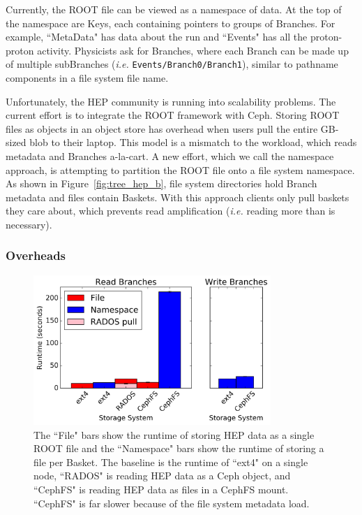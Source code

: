 Currently, the ROOT file can be viewed as a namespace of data. At the top of
the namespace are Keys, each containing pointers to groups of Branches. For
example, ``MetaData" has data about the run and ``Events" has all the
proton-proton activity. Physicists ask for Branches, where each Branch can be
made up of multiple subBranches ({\it i.e.} \texttt{Events/Branch0/Branch1}),
similar to pathname components in a file system file name. 

Unfortunately, the HEP community is running into scalability problems.  The
current effort is to integrate the ROOT framework with Ceph.  Storing ROOT
files as objects in an object store has overhead when users pull the entire
GB-sized blob to their laptop.  This model is a mismatch to the workload, which
reads metadata and Branches a-la-cart. A new effort, which we call the
namespace approach, is attempting to partition the ROOT file onto a file system
namespace. As shown in Figure~\ref{fig:tree_hep_b}, file system directories
hold Branch metadata and files contain Baskets. With this approach clients only
pull baskets they care about, which prevents read amplification ({\it i.e.}
reading more than is necessary).


\subsubsection{Overheads}

\begin{figure}[tb]
\centering
  \includegraphics[width=90mm]{figures/hep_runtime.png}
  \caption{The ``File" bars show the runtime of storing HEP data as a single
ROOT file and the ``Namespace" bars show the runtime of storing a file per
Basket. The baseline is the runtime of ``ext4" on a single node, ``RADOS" is
reading HEP data as a Ceph object, and ``CephFS" is reading HEP data as files
in a CephFS mount. ``CephFS" is far slower because of the file system metadata
load.}
  \label{fig:hep_runtime}
\end{figure}

